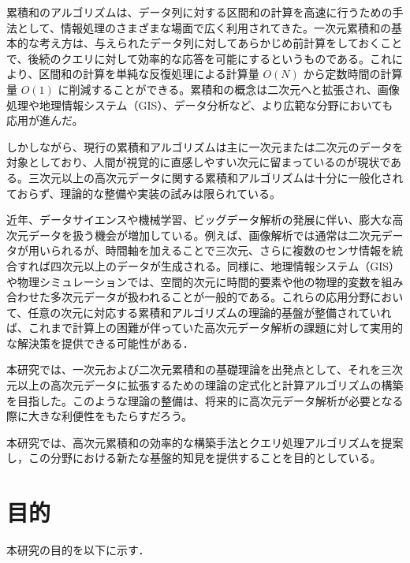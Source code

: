 \documentclass{jsreport}
\theoremstyle{plain} %
\theoremstyle{definition}
\begin{document}
累積和のアルゴリズムは、データ列に対する区間和の計算を高速に行うための手法として、情報処理のさまざまな場面で広く利用されてきた。一次元累積和の基本的な考え方は、与えられたデータ列に対してあらかじめ前計算をしておくことで、後続のクエリに対して効率的な応答を可能にするというものである。これにより、区間和の計算を単純な反復処理による計算量 \({O}(N)\) から定数時間の計算量 \({O}(1)\) に削減することができる。累積和の概念は二次元へと拡張され、画像処理や地理情報システム（GIS）、データ分析など、より広範な分野においても応用が進んだ。

しかしながら、現行の累積和アルゴリズムは主に一次元または二次元のデータを対象としており、人間が視覚的に直感しやすい次元に留まっているのが現状である。三次元以上の高次元データに関する累積和アルゴリズムは十分に一般化されておらず、理論的な整備や実装の試みは限られている。

近年、データサイエンスや機械学習、ビッグデータ解析の発展に伴い、膨大な高次元データを扱う機会が増加している。例えば、画像解析では通常は二次元データが用いられるが、時間軸を加えることで三次元、さらに複数のセンサ情報を統合すれば四次元以上のデータが生成される。同様に、地理情報システム（GIS）や物理シミュレーションでは、空間的次元に時間的要素や他の物理的変数を組み合わせた多次元データが扱われることが一般的である。これらの応用分野において、任意の次元に対応する累積和アルゴリズムの理論的基盤が整備されていれば、これまで計算上の困難が伴っていた高次元データ解析の課題に対して実用的な解決策を提供できる可能性がある．

本研究では、一次元および二次元累積和の基礎理論を出発点として、それを三次元以上の高次元データに拡張するための理論の定式化と計算アルゴリズムの構築を目指した。このような理論の整備は、将来的に高次元データ解析が必要となる際に大きな利便性をもたらすだろう。

本研究では、高次元累積和の効率的な構築手法とクエリ処理アルゴリズムを提案し，この分野における新たな基盤的知見を提供することを目的としている。

\newpage
\section{目的}

本研究の目的を以下に示す．
\end{document}
